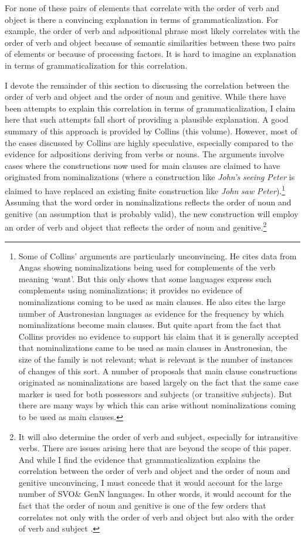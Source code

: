\documentclass[output=paper]{langsci/langscibook}
\begin{document}
For none of these pairs of elements that correlate with the order of verb and object is there a convincing explanation in terms of grammaticalization. For example, the order of verb and adpositional phrase most likely correlates with the order of verb and object because of semantic similarities between these two pairs of elements or because of processing factors. It is hard to imagine an explanation in terms of grammaticalization for this correlation.

I devote the remainder of this section to discussing the correlation between the order of verb and object and the order of noun and genitive. While there have been attempts to explain this correlation in terms of grammaticalization, I claim here that such attempts fall short of providing a plausible explanation. A good summary of this approach is provided by Collins (this volume). However, most of the cases discussed by Collins are highly speculative, especially compared to the evidence for adpositions deriving from verbs or nouns. The arguments involve cases where the constructions now used for main clauses are claimed to have originated from nominalizations (where a construction like \textit{John’s} \textit{seeing} \textit{Peter} is claimed to have replaced an existing finite construction like \textit{John} \textit{saw} \textit{Peter}).\footnote{Some of Collins’ arguments are particularly unconvincing. He cites data from Angas showing nominalizations being used for complements of the verb meaning ‘want’. But this only shows that some languages express such complements using nominalizations; it provides no evidence of nominalizations coming to be used as main clauses. He also cites the large number of Austronesian languages as evidence for the frequency by which nominalizations become main clauses. But quite apart from the fact that Collins provides no evidence to support his claim that it is generally accepted that nominalizations came to be used as main clauses in Austronesian, the size of the family is not relevant; what is relevant is the number of instances of changes of this sort. A number of proposals that main clause constructions originated as nominalizations are based largely on the fact that the same case marker is used for both possessors and subjects (or transitive subjects). But there are many ways by which this can arise without nominalizations coming to be used as main clauses.} Assuming that the word order in nominalizations reflects the order of noun and genitive (an assumption that is probably valid), the new construction will employ an order of verb and object that reflects the order of noun and genitive.\footnote{It will also determine the order of verb and subject, especially for intransitive verbs. There are issues arising here that are beyond the scope of this paper. And while I find the evidence that grammaticalization explains the correlation between the order of verb and object and the order of noun and genitive unconvincing, I must concede that it would account for the large number of SVO\& GenN languages. In other words, it would account for the fact that the order of noun and genitive is one of the few orders that correlates not only with the order of verb and object but also with the order of verb and subject \citep{Dryer2013}.}
\end{document}
